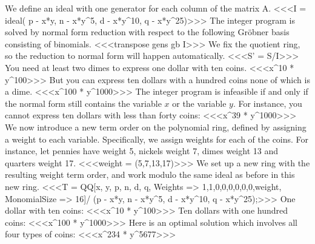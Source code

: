 We define an ideal with one generator for each column of the matrix A.
<<<I = ideal( p - x*y, n - x*y^5, d - x*y^10, q - x*y^25)>>>
The integer program is solved by normal form reduction with respect
to the following Gr\"obner basis consisting of binomials.
<<<transpose gens gb I>>>
We fix the quotient ring, so the reduction to normal form
will happen automatically.
<<<S' = S/I>>>
You need at least two dimes to express one dollar with ten coins.
<<<x^10 * y^100>>>
But you can express ten dollars with a hundred coins none of which is a dime.
<<<x^100 * y^1000>>>
The integer program is infeasible if and only if the normal form still
contains the variable $x$ or the variable $y$. For instance, you cannot
express ten dollars with less than forty coins:
<<<x^39 * y^1000>>>
We now introduce a new term order on the polynomial ring, defined
by assigning a weight to each variable. Specifically, we assign
weights for each of the coins. For instance,
let pennies have weight 5, nickels weight 7, 
dimes weight 13 and quarters weight 17.
<<<weight = (5,7,13,17)>>>
We set up a new ring with the resulting weight term order, and work modulo
the same ideal as before in this new ring.
<<<T = QQ[x, y, p, n, d, q, 
          Weights => {{1,1,0,0,0,0},{0,0,weight}},
          MonomialSize => 16]/
      (p - x*y, n - x*y^5, d - x*y^10, q - x*y^25);>>>
One dollar with ten coins:
<<<x^10 * y^100>>>
Ten dollars with one hundred coins:
<<<x^100 * y^1000>>>
Here is an optimal solution which involves all four types of coins:
<<<x^234 * y^5677>>>
